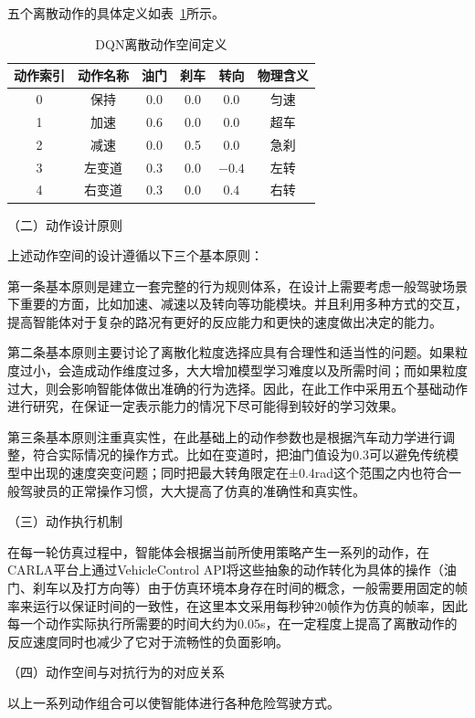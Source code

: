 五个离散动作的具体定义如表~\ref{tab:dqn_action_space}所示。
\begin{table}[htbp]
  \centering
  \caption{DQN离散动作空间定义}
  \label{tab:dqn_action_space}
  \begin{tabular}{ccccc c}
    \toprule
    动作索引 & 动作名称 & 油门 & 刹车 & 转向 & 物理含义 \\
    \midrule
    0 & 保持 & 0.0 & 0.0 & 0.0 & 匀速 \\
    1 & 加速 & 0.6 & 0.0 & 0.0 & 超车 \\
    2 & 减速 & 0.0 & 0.5 & 0.0 & 急刹 \\
    3 & 左变道 & 0.3 & 0.0 & $-0.4$ & 左转 \\
    4 & 右变道 & 0.3 & 0.0 & $0.4$ & 右转 \\
    \bottomrule
  \end{tabular}
\end{table}

（二）动作设计原则

上述动作空间的设计遵循以下三个基本原则：

第一条基本原则是建立一套完整的行为规则体系，在设计上需要考虑一般驾驶场景下重要的方面，比如加速、减速以及转向等功能模块。并且利用多种方式的交互，提高智能体对于复杂的路况有更好的反应能力和更快的速度做出决定的能力。

第二条基本原则主要讨论了离散化粒度选择应具有合理性和适当性的问题。如果粒度过小，会造成动作维度过多，大大增加模型学习难度以及所需时间；而如果粒度过大，则会影响智能体做出准确的行为选择。因此，在此工作中采用五个基础动作进行研究，在保证一定表示能力的情况下尽可能得到较好的学习效果。

第三条基本原则注重真实性，在此基础上的动作参数也是根据汽车动力学进行调整，符合实际情况的操作方式。比如在变道时，把油门值设为0.3可以避免传统模型中出现的速度突变问题；同时把最大转角限定在±0.4rad这个范围之内也符合一般驾驶员的正常操作习惯，大大提高了仿真的准确性和真实性。

（三）动作执行机制

在每一轮仿真过程中，智能体会根据当前所使用策略产生一系列的动作，在CARLA平台上通过VehicleControl API将这些抽象的动作转化为具体的操作（油门、刹车以及打方向等）由于仿真环境本身存在时间的概念，一般需要用固定的帧率来运行以保证时间的一致性，在这里本文采用每秒钟20帧作为仿真的帧率，因此每一个动作实际执行所需要的时间大约为0.05s，在一定程度上提高了离散动作的反应速度同时也减少了它对于流畅性的负面影响。

（四）动作空间与对抗行为的对应关系

以上一系列动作组合可以使智能体进行各种危险驾驶方式。

